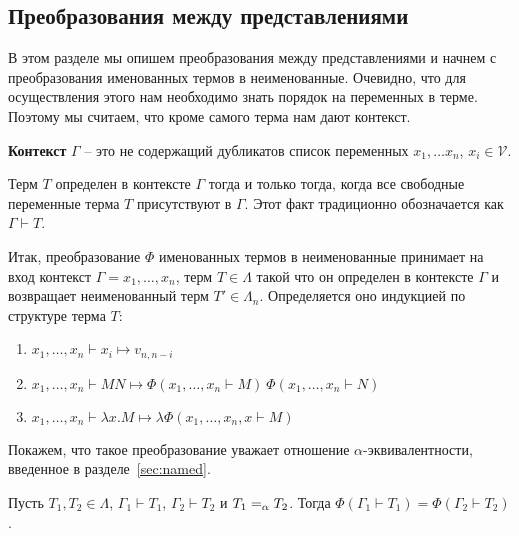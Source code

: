 \subsection{Преобразования между представлениями}

В этом разделе мы опишем преобразования между представлениями и начнем с преобразования именованных термов в неименованные. Очевидно, что для осуществления этого нам необходимо знать порядок на переменных в терме. Поэтому мы считаем, что кроме самого терма нам дают контекст.

\begin{definition}
  \textbf{Контекст} $\Gamma$ -- это не содержащий дубликатов список переменных $x_{1}, \dots x_{n}$, $x_{i} \in \mathcal{V}$.
\end{definition}

\begin{definition}
  Терм $T$ определен в контексте $\Gamma$ тогда и только тогда, когда все свободные переменные терма $T$ присутствуют в $\Gamma$. Этот факт традиционно обозначается как $\Gamma \vdash T$.
\end{definition}

Итак, преобразование $\Phi$ именованных термов в неименованные принимает на вход контекст $\Gamma = x_{1}, \dots, x_{n}$, терм $T \in \Lambda$  такой что он определен в контексте $\Gamma$ и возвращает неименованный терм $T' \in \Lambda_{n}$. Определяется оно индукцией по структуре терма $T$:

\begin{enumerate}
  \item $x_{1}, \dots, x_{n} \vdash x_{i} \mapsto v_{n, n - i}$
  \item $x_{1}, \dots, x_{n} \vdash M N \mapsto \Phi(x_{1}, \dots, x_{n} \vdash M)\ \Phi(x_{1}, \dots, x_{n} \vdash N)$
  \item $x_{1}, \dots, x_{n} \vdash \lambda x.M \mapsto \lambda \Phi(x_{1}, \dots, x_{n} , x \vdash M)$
\end{enumerate}

Покажем, что такое преобразование уважает отношение $\alpha$-эквивалентности, введенное в разделе~\ref{sec:named}.

\begin{prop}
  Пусть $T_{1}, T_{2} \in \Lambda$, $\Gamma_{1} \vdash T_{1}$, $\Gamma_{2} \vdash T_{2}$ и $T_{1} =_{\alpha} T_{2}$. Тогда $\Phi(\Gamma_{1} \vdash T_{1}) = \Phi(\Gamma_{2} \vdash T_{2})$.
\end{prop}


